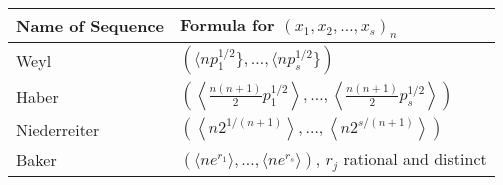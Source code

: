 \documentclass[11pt]{article}
\begin{document}
\begin{longtable}[]{@{}ll@{}}
\toprule
\begin{minipage}[b]{0.22\columnwidth}\raggedright\strut
Name of Sequence\strut
\end{minipage} & \begin{minipage}[b]{0.52\columnwidth}\raggedright\strut
Formula for \((x_1, x_2, \ldots, x_s)_n\)\strut
\end{minipage}\tabularnewline
\midrule
\endhead
\begin{minipage}[t]{0.22\columnwidth}\raggedright\strut
Weyl\strut
\end{minipage} & \begin{minipage}[t]{0.52\columnwidth}\raggedright\strut
\((\langle np_1^{1/2}\}, \ldots, \langle np_s^{1/2}\})\)\strut
\end{minipage}\tabularnewline
\begin{minipage}[t]{0.22\columnwidth}\raggedright\strut
Haber\strut
\end{minipage} & \begin{minipage}[t]{0.52\columnwidth}\raggedright\strut
\(\left(\left\langle\frac{n(n+1)}{2}p_1^{1/2}\right\rangle,\ldots,\left\langle\frac{n(n+1)}{2}p_s^{1/2}\right\rangle\right)\)\strut
\end{minipage}\tabularnewline
\begin{minipage}[t]{0.22\columnwidth}\raggedright\strut
Niederreiter\strut
\end{minipage} & \begin{minipage}[t]{0.52\columnwidth}\raggedright\strut
\(\left(\left\langle n2^{1/(n+1)}\right\rangle,\ldots,\left\langle n2^{s/(n+1)}\right\rangle\right)\)\strut
\end{minipage}\tabularnewline
\begin{minipage}[t]{0.22\columnwidth}\raggedright\strut
Baker\strut
\end{minipage} & \begin{minipage}[t]{0.52\columnwidth}\raggedright\strut
\((\langle ne^{r_1}\rangle,\ldots,\langle ne^{r_s}\rangle)\), \(r_j\)
rational and distinct\strut
\end{minipage}\tabularnewline
\bottomrule
\end{longtable}
\end{document}
